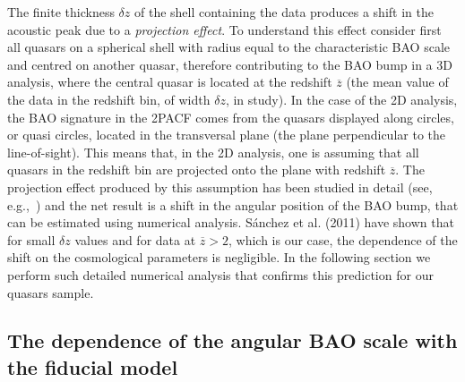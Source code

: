 \documentclass[a4paper,11pt]{article}
\begin{document}
The finite thickness $\delta z$ of the shell containing the data produces a shift in the acoustic peak 
due to a {\em projection effect}. 
To understand this effect consider first all quasars on a spherical shell with radius equal to the 
characteristic BAO scale and centred on another quasar, therefore  
contributing to the BAO bump in a 3D analysis, where the central quasar is located at the redshift 
$\overline{z}$ (the mean value of the data in the redshift bin, of width $\delta z$, in study). 
In the case of the 2D analysis, the BAO signature in the 2PACF comes from the quasars displayed 
along circles, or quasi circles, located in the transversal plane (the plane perpendicular to the 
line-of-sight). 
This means that, in the 2D analysis, one is assuming that all quasars in the redshift bin are projected 
onto the plane with redshift $\overline{z}$. 
The projection effect produced by this assumption has been studied in detail (see, 
e.g.,~\cite{Sanchez11,Carvalho}) and the net result is a shift in the angular position of the BAO 
bump, that can be estimated using numerical analysis. 
S\'anchez et al. (2011) have shown that for small $\delta z$ values and for data at $\overline{z} > 2$, 
which is our case, the dependence of the shift on the cosmological parameters is negligible. 
In the following section we perform such detailed numerical analysis that confirms this prediction 
for our quasars sample. 



\subsection{The dependence of the angular BAO scale with the fiducial model} 
\end{document}
